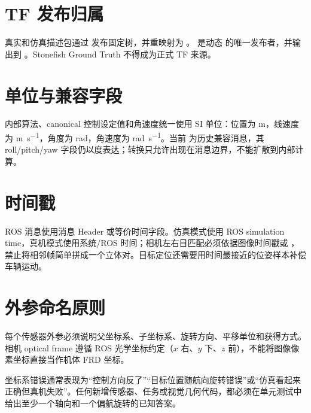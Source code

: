 \section{TF 发布归属}
真实和仿真描述包通过  发布固定树，并重映射为 。 是动态  的唯一发布者，并输出到 。Stonefish Ground Truth 不得成为正式 TF 来源。

\section{单位与兼容字段}
内部算法、canonical 控制设定值和角速度统一使用 SI 单位：位置为 \si{m}，线速度为 \si{m.s^{-1}}，角度为 \si{rad}，角速度为 \si{rad.s^{-1}}。当前  为历史兼容消息，其 roll/pitch/yaw 字段仍以度表达；转换只允许出现在消息边界，不能扩散到内部计算。

\section{时间戳}
ROS 消息使用消息 Header 或等价时间字段。仿真模式使用 ROS simulation time，真机模式使用系统/ROS 时间；相机左右目匹配必须依据图像时间戳或 ，禁止将相邻帧简单拼成一个立体对。目标定位还需要用时间最接近的位姿样本补偿车辆运动。

\section{外参命名原则}
每个传感器外参必须说明父坐标系、子坐标系、旋转方向、平移单位和获得方式。相机 optical frame 遵循 ROS 光学坐标约定（$x$ 右、$y$ 下、$z$ 前），不能将图像像素坐标直接当作机体 FRD 坐标。

\begin{warningbox}
坐标系错误通常表现为“控制方向反了”“目标位置随航向旋转错误”或“仿真看起来正确但真机失败”。任何新增传感器、任务或视觉几何代码，都必须在单元测试中给出至少一个轴向和一个偏航旋转的已知答案。
\end{warningbox}
